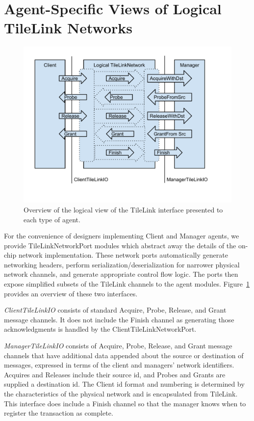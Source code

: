 \section{Agent-Specific Views of Logical TileLink Networks}

\begin{figure}[p]
\centering
\includegraphics[width=1\columnwidth]{tilelink/figures/agent-specific.pdf}
\caption[Agent-specific views of TileLink.]{Overview of the logical view of the TileLink interface presented to each type of agent.}
\label{fig:agent}
\end{figure}

For the convenience of designers implementing Client and Manager agents, we provide TileLinkNetworkPort modules which abstract away the details of the on-chip network implementation.
These network ports automatically generate networking headers, perform serialization/deserialization for narrower physical network channels, and generate appropriate control flow logic.
The ports then expose simplified subsets of the TileLink channels to the agent modules.
Figure~\ref{fig:agent} provides an overview of these two interfaces.

{\em ClientTileLinkIO} consists of standard Acquire, Probe, Release, and Grant message channels.
It does not include the Finish channel as generating those acknowledgments is handled by the ClientTileLinkNetworkPort.

{\em ManagerTileLinkIO} consists of Acquire, Probe, Release, and Grant message channels that have additional data appended about the source or destination of messages, expressed in terms of the client and managers' network identifiers.
Acquires and Releases include their source id, and Probes and Grants are supplied a destination id.
The Client id format and numbering is determined by the characteristics of the physical network and is encapsulated from TileLink.
This interface does include a Finish channel so that the manager knows when to register the transaction as complete.

